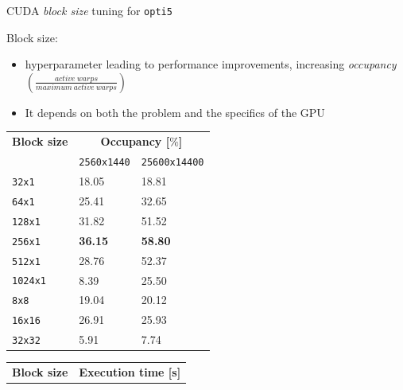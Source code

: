 \documentclass[10pt]{beamer}
\begin{document}
\begin{frame}{CUDA \textit{block size} tuning for \texttt{opti5}}

Block size: 
\begin{itemize}
	\vspace{-0.2cm}
	\item hyperparameter leading to performance improvements, increasing \textit{occupancy} $\left(\frac{active~warps}{maximum~active~warps}\right)$
	\item It depends on both the problem and the specifics of the GPU
\end{itemize}

\begin{table}[H]
	\vspace{-0.1cm}
	\footnotesize
	\hspace{-1.8cm}
	\begin{subtable}{.38\linewidth}
		\centering
		\begin{tabular}{|l|l|l|} 
			\hline
			\textbf{Block size} & \multicolumn{2}{|c|}{\textbf{Occupancy [$\%$]}} \\
			\cline{2-3}
			& \texttt{2560x1440} & \texttt{25600x14400} \\ [0.2ex] 
			\hline\hline
			\texttt{32x1} & 18.05 & 18.81 \\ 
			\texttt{64x1} & 25.41 & 32.65 \\
			\texttt{128x1} & 31.82 & 51.52 \\
			\texttt{256x1} & \textbf{36.15} & \textbf{58.80} \\
			\texttt{512x1} & 28.76 & 52.37 \\
			\texttt{1024x1} & 8.39 & 25.50 \\
			\texttt{8x8} & 19.04 & 20.12 \\
			\texttt{16x16} & 26.91 & 25.93 \\
			\texttt{32x32} & 5.91 & 7.74 \\ [0.2ex] 
			\hline
		\end{tabular}
	\end{subtable}%
	\hspace{1.8cm}
	\begin{subtable}{.38\linewidth}
		\centering
		\begin{tabular}{|l|l|l|} 
			\hline
			\textbf{Block size} & \multicolumn{2}{|c|}{\textbf{Execution time [s]}} \\

\end{tabular}
\end{subtable}
\end{table}
\end{frame}
\end{document}
